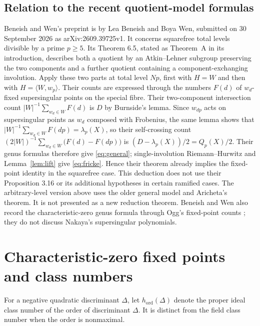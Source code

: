 \documentclass[11pt,a4paper]{article}
\theoremstyle{remark}\newtheorem{remark}[theorem]{Remark}
\numberwithin{equation}{section}
\newcommand{\ho}{h_{\mathrm{ord}}}
\begin{document}
\subsection{Relation to the recent quotient-model formulas}\label{sec:prior}
Beneish and Wen's preprint \cite{BW} is by Lea Beneish and Boya Wen, submitted on 30 September 2026 as arXiv:2609.39725v1. It concerns squarefree total levels divisible by a prime $p\geq5$. Its Theorem 6.5, stated as Theorem~A in its introduction, describes both a quotient by an Atkin--Lehner subgroup preserving the two components and a further quotient containing a component-exchanging involution. Apply these two parts at total level $Np$, first with $H=W$ and then with $H=\langle W,w_p\rangle$. Their counts are expressed through the numbers $F(d)$ of $w_d$-fixed supersingular points on the special fibre. Their two-component intersection count $|W|^{-1}\sum_{w_d\in W}F(d)$ is $D$ by Burnside's lemma. Since $w_{dp}$ acts on supersingular points as $w_d$ composed with Frobenius, the same lemma shows that $|W|^{-1}\sum_{w_d\in W}F(dp)=\lambda_p(X)$, so their self-crossing count $(2|W|)^{-1}\sum_{w_d\in W}\bigl(F(d)-F(dp)\bigr)$ is $(D-\lambda_p(X))/2=Q_p(X)/2$. Their genus formulas therefore give \eqref{eq:general}; single-involution Riemann--Hurwitz and Lemma~\ref{lem:lift} give \eqref{eq:fricke}. Hence their theorem already implies the fixed-point identity in the squarefree case. This deduction does not use their Proposition 3.16 or its additional hypotheses in certain ramified cases. The arbitrary-level version above uses the older general model and Aricheta's theorem. It is not presented as a new reduction theorem. Beneish and Wen also record the characteristic-zero genus formula through Ogg's fixed-point counts \cite[Remark 6.6]{BW}; they do not discuss Nakaya's supersingular polynomials.

\section{Characteristic-zero fixed points and class numbers}\label{sec:class}
For a negative quadratic discriminant $\Delta$, let $\ho(\Delta)$ denote the proper ideal class number of the order of discriminant $\Delta$. It is distinct from the field class number when the order is nonmaximal.
\end{document}
